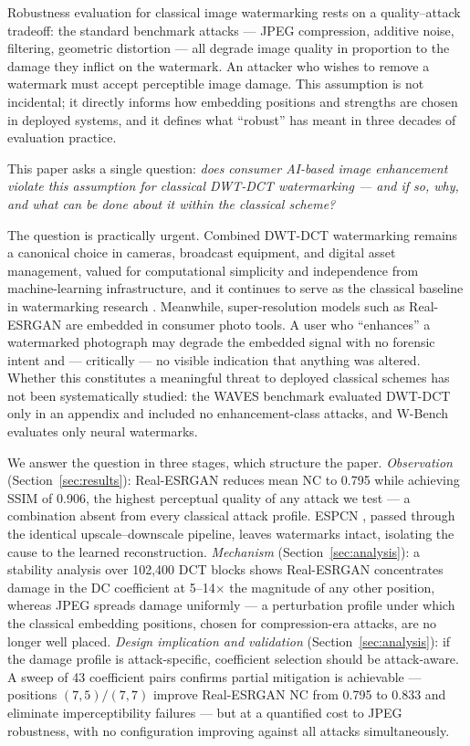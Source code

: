 \documentclass[conference]{IEEEtran}
\begin{document}
Robustness evaluation for classical image watermarking rests on a
quality--attack tradeoff: the standard benchmark attacks --- JPEG
compression, additive noise, filtering, geometric distortion
\cite{petitcolas1998,cox2007} --- all degrade image quality in
proportion to the damage they inflict on the watermark. An attacker
who wishes to remove a watermark must accept perceptible image damage.
This assumption is not incidental; it directly informs how embedding
positions and strengths are chosen in deployed systems, and it defines
what ``robust'' has meant in three decades of evaluation practice.

This paper asks a single question: \emph{does consumer AI-based image
enhancement violate this assumption for classical DWT-DCT
watermarking --- and if so, why, and what can be done about it within
the classical scheme?}

The question is practically urgent. Combined DWT-DCT watermarking
\cite{alhaj2007} remains a canonical choice in cameras, broadcast
equipment, and digital asset management, valued for computational
simplicity and independence from machine-learning infrastructure, and
it continues to serve as the classical baseline in watermarking
research \cite{waves2024}. Meanwhile, super-resolution models such as
Real-ESRGAN \cite{realesrgan2021} are embedded in consumer photo
tools. A user who ``enhances'' a watermarked photograph may degrade
the embedded signal with no forensic intent and --- critically --- no
visible indication that anything was altered. Whether this constitutes
a meaningful threat to deployed classical schemes has not been
systematically studied: the WAVES benchmark \cite{waves2024} evaluated
DWT-DCT only in an appendix and included no enhancement-class attacks,
and W-Bench \cite{wbench2024} evaluates only neural watermarks.

We answer the question in three stages, which structure the paper.
\emph{Observation} (Section~\ref{sec:results}): Real-ESRGAN reduces
mean NC to 0.795 while achieving SSIM of 0.906, the highest perceptual
quality of any attack we test --- a combination absent from every
classical attack profile. ESPCN \cite{espcn2016}, passed through the
identical upscale--downscale pipeline, leaves watermarks intact,
isolating the cause to the learned reconstruction.
\emph{Mechanism} (Section~\ref{sec:analysis}): a stability analysis
over 102,400 DCT blocks shows Real-ESRGAN concentrates damage in the
DC coefficient at 5--14$\times$ the magnitude of any other position,
whereas JPEG spreads damage uniformly --- a perturbation profile under
which the classical embedding positions, chosen for compression-era
attacks, are no longer well placed.
\emph{Design implication and validation}
(Section~\ref{sec:analysis}): if the damage profile is
attack-specific, coefficient selection should be attack-aware. A sweep
of 43 coefficient pairs confirms partial mitigation is achievable ---
positions $(7,5)/(7,7)$ improve Real-ESRGAN NC from 0.795 to 0.833 and
eliminate imperceptibility failures --- but at a quantified cost to
JPEG robustness, with no configuration improving against all attacks
simultaneously.
\end{document}
